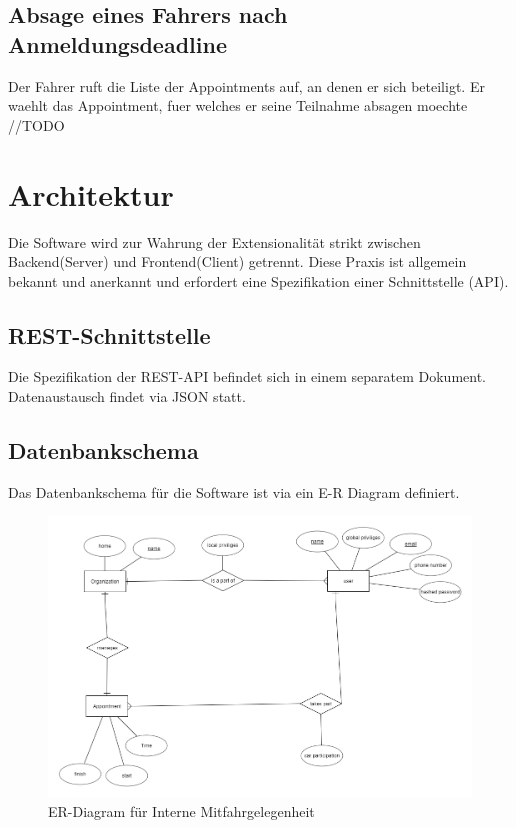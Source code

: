 \documentclass[11pt,a4paper]{article}
\begin{document}
\subsection*{Absage eines Fahrers nach Anmeldungsdeadline}
Der Fahrer ruft die Liste der Appointments auf, an denen er sich beteiligt. Er waehlt das Appointment, fuer welches er seine Teilnahme absagen moechte //TODO

\section{Architektur}
Die Software wird zur Wahrung der Extensionalität strikt zwischen Backend(Server) und Frontend(Client) getrennt. Diese Praxis ist allgemein bekannt und anerkannt und erfordert eine Spezifikation einer Schnittstelle (API).
\subsection{REST-Schnittstelle}
Die Spezifikation der REST-API befindet sich in einem separatem Dokument.
Datenaustausch findet via JSON statt.
\subsection{Datenbankschema}
Das Datenbankschema für die Software ist via ein E-R Diagram definiert.\\
\begin{figure}[!htb]
\includegraphics[width=\textwidth]{ER_Diagram.png}
\caption{ER-Diagram für Interne Mitfahrgelegenheit}
\end{figure}
\end{document}
